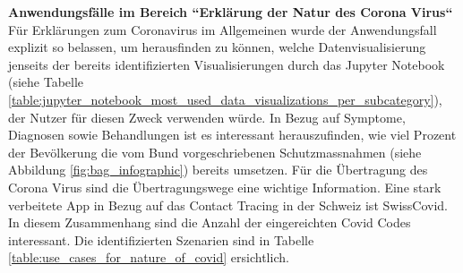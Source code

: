 \begin{table}[h]
\centering
{}
\caption{Zuordnung der Anwendungsfälle für die Kategorie ``Einfluss der Pandemie`` (Eigene Darstellung)}
\label{table:use_cases_for_influence_of_pandemic}
\end{table}

\noindent
\textbf{Anwendungsfälle im Bereich ``Erklärung der Natur des Corona Virus``}
\newline
\indent
Für Erklärungen zum Coronavirus im Allgemeinen wurde der Anwendungsfall explizit so belassen, um herausfinden zu können, welche Datenvisualisierung jenseits der bereits identifizierten Visualisierungen durch das Jupyter Notebook (siehe Tabelle \ref{table:jupyter_notebook_most_used_data_visualizations_per_subcategory}), der Nutzer für diesen Zweck verwenden würde. In Bezug auf Symptome, Diagnosen sowie Behandlungen ist es interessant herauszufinden, wie viel Prozent der Bevölkerung die vom Bund vorgeschriebenen Schutzmassnahmen (siehe Abbildung \ref{fig:bag_infographic}) bereits umsetzen. Für die Übertragung des Corona Virus sind die Übertragungswege eine wichtige Information. Eine stark verbeitete App in Bezug auf das Contact Tracing in der Schweiz ist SwissCovid. In diesem Zusammenhang sind die Anzahl der eingereichten Covid Codes interessant. Die identifizierten Szenarien sind in Tabelle \ref{table:use_cases_for_nature_of_covid} ersichtlich.

